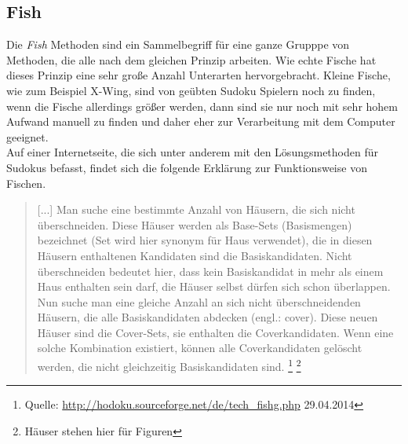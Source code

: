 \newpage
\subsection{Fish}
\label{Fish}
Die \textit{Fish} Methoden sind ein Sammelbegriff für eine ganze Grupppe von Methoden, die alle nach dem gleichen Prinzip arbeiten. Wie echte Fische hat dieses Prinzip eine sehr große Anzahl Unterarten hervorgebracht. Kleine Fische, wie zum Beispiel X-Wing, sind von geübten Sudoku Spielern noch zu finden, wenn die Fische allerdings größer werden, dann sind sie nur noch mit sehr hohem Aufwand manuell zu finden und daher eher zur Verarbeitung mit dem Computer geeignet. \\
Auf einer Internetseite, die sich unter anderem mit den Lösungsmethoden für Sudokus befasst, findet sich die folgende Erklärung zur Funktionsweise von Fischen.

\begin{quote}[...] Man suche eine bestimmte Anzahl von Häusern, die sich nicht überschneiden. Diese Häuser werden als Base-Sets (Basismengen) bezeichnet (Set wird hier synonym für Haus verwendet), die in diesen Häusern enthaltenen Kandidaten sind die Basiskandidaten. Nicht überschneiden bedeutet hier, dass kein Basiskandidat in mehr als einem Haus enthalten sein darf, die Häuser selbst dürfen sich schon überlappen. Nun suche man eine gleiche Anzahl an sich nicht überschneidenden Häusern, die alle Basiskandidaten abdecken (engl.: cover). Diese neuen Häuser sind die Cover-Sets, sie enthalten die Coverkandidaten. Wenn eine solche Kombination existiert, können alle Coverkandidaten gelöscht werden, die nicht gleichzeitig Basiskandidaten sind.
\footnote{Quelle: \url{http://hodoku.sourceforge.net/de/tech_fishg.php} 29.04.2014}
\footnote{Häuser stehen hier für Figuren}
\end{quote}